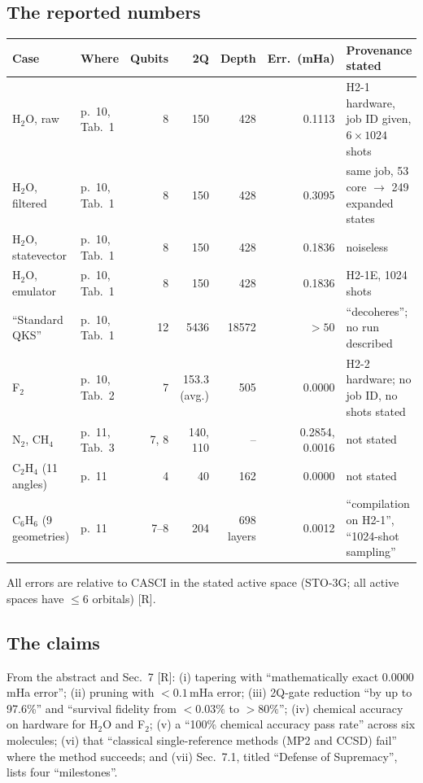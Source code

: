 \documentclass[11pt,a4paper]{article}
\newcommand{\lR}{\textcolor{keyblue}{[R]}}   %
\begin{document}
\subsection{The reported numbers}
\begin{center}\small
\begin{tabularx}{\linewidth}{@{}L{2.6cm}L{1.5cm}rrrrY@{}}
\toprule
Case & Where & Qubits & 2Q & Depth & Err.\ (mHa) & Provenance stated\\\midrule
H$_2$O, raw & p.~10, Tab.~1 & 8 & 150 & 428 & 0.1113 & H2-1 hardware, job ID given, $6\times1024$ shots\\
H$_2$O, filtered & p.~10, Tab.~1 & 8 & 150 & 428 & 0.3095 & same job, 53 core $\to$ 249 expanded states\\
H$_2$O, statevector & p.~10, Tab.~1 & 8 & 150 & 428 & 0.1836 & noiseless\\
H$_2$O, emulator & p.~10, Tab.~1 & 8 & 150 & 428 & 0.1836 & H2-1E, 1024 shots\\
``Standard QKS'' & p.~10, Tab.~1 & 12 & 5436 & 18572 & $>50$ & ``decoheres''; no run described\\
F$_2$ & p.~10, Tab.~2 & 7 & 153.3 (avg.) & 505 & 0.0000 & H2-2 hardware; no job ID, no shots stated\\
N$_2$, CH$_4$ & p.~11, Tab.~3 & 7, 8 & 140, 110 & -- & 0.2854, 0.0016 & not stated\\
C$_2$H$_4$ (11 angles) & p.~11 & 4 & 40 & 162 & 0.0000 & not stated\\
C$_6$H$_6$ (9 geometries) & p.~11 & 7--8 & 204 & 698 layers & 0.0012 & ``compilation on H2-1'', ``1024-shot sampling''\\
\bottomrule
\end{tabularx}
\end{center}
All errors are relative to CASCI in the stated active space (STO-3G; all active spaces have $\le 6$ orbitals) \lR.

\subsection{The claims}
From the abstract and Sec.~7 \lR: (i) tapering with ``mathematically exact 0.0000\,mHa error''; (ii) pruning with $<0.1$\,mHa error; (iii) 2Q-gate reduction ``by up to 97.6\%'' and ``survival fidelity from $<0.03\%$ to $>80\%$''; (iv) chemical accuracy on hardware for H$_2$O and F$_2$; (v) a ``100\% chemical accuracy pass rate'' across six molecules; (vi) that ``classical single-reference methods (MP2 and CCSD) fail'' where the method succeeds; and (vii) Sec.~7.1, titled ``Defense of Supremacy'', lists four ``milestones''.
\end{document}
